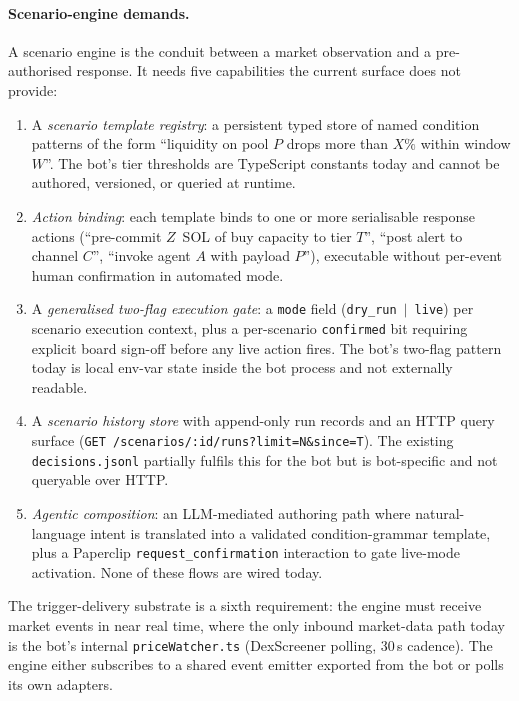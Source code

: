 \documentclass[11pt,a4paper]{article}
\begin{document}
\paragraph{Scenario-engine demands.} A scenario engine is the conduit between a market
observation and a pre-authorised response. It needs five capabilities the current
surface does not provide:
\begin{enumerate}
  \item A \emph{scenario template registry}: a persistent typed store of named
        condition patterns of the form ``liquidity on pool $P$ drops more than $X\%$
        within window $W$''. The bot's tier thresholds are TypeScript constants today
        and cannot be authored, versioned, or queried at runtime.
  \item \emph{Action binding}: each template binds to one or more serialisable
        response actions (``pre-commit $Z$~SOL of buy capacity to tier $T$'', ``post
        alert to channel $C$'', ``invoke agent $A$ with payload $P$''), executable
        without per-event human confirmation in automated mode.
  \item A \emph{generalised two-flag execution gate}: a \texttt{mode} field
        (\texttt{dry\_run}~$|$~\texttt{live}) per scenario execution context, plus a
        per-scenario \texttt{confirmed} bit requiring explicit board sign-off before
        any live action fires. The bot's two-flag pattern today is local env-var
        state inside the bot process and not externally readable.
  \item A \emph{scenario history store} with append-only run records and an HTTP
        query surface (\texttt{GET /scenarios/:id/runs?limit=N\&since=T}). The
        existing \texttt{decisions.jsonl} partially fulfils this for the bot but is
        bot-specific and not queryable over HTTP.
  \item \emph{Agentic composition}: an LLM-mediated authoring path where natural-
        language intent is translated into a validated condition-grammar template,
        plus a Paperclip \texttt{request\_confirmation} interaction to gate live-mode
        activation. None of these flows are wired today.
\end{enumerate}
The trigger-delivery substrate is a sixth requirement: the engine must receive market
events in near real time, where the only inbound market-data path today is the bot's
internal \texttt{priceWatcher.ts} (DexScreener polling, 30\,s cadence). The engine
either subscribes to a shared event emitter exported from the bot or polls its own
adapters.
\end{document}
